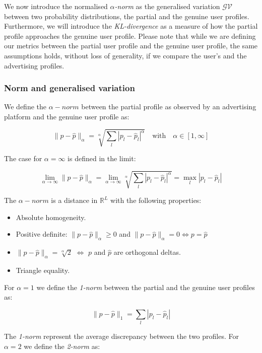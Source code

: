 We now introduce the normalised \emph{$\alpha$-norm} as the generalised variation $\mathcal{GV}$ between two probability distributions, the partial and the genuine user profiles. Furthermore, we will introduce the \emph{KL-divergence} as a measure of how the partial profile approaches the genuine user profile. Please note that while we are defining our metrics between the partial user profile and the genuine user profile, the same assumptions holds, without loss of generality, if we compare the user's and the advertising profiles.

\subsubsection{Norm and generalised variation}

We define the $\alpha-norm$ between the partial profile as observed by an advertising platform and the genuine user profile as:

$$ \| p - \hat{p} \|_\alpha = \sqrt[\alpha]{\sum_l{ {| p_l - \hat{p}_l |}^\alpha }} \quad  \text{with} \quad  \alpha \in [1, \infty] $$

The case for $\alpha = \infty$ is defined in the limit:

$$\lim_{\alpha\to\infty} \| p - \hat{p} \|_\alpha = \lim_{\alpha\to\infty} \sqrt[\alpha]{\sum_l{ {| p_l - \hat{p}_l |}^\alpha }} = \max_l { | p_l - \hat{p}_l | } $$

The $\alpha-norm$ is a distance in $\mathbb{R}^L$ with the following properties:

\begin{itemize}
 \item Absolute homogeneity.
 \item Positive definite: $ \| p - \hat{p} \|_\alpha \ge 0$ and $  \| p - \hat{p} \|_\alpha = 0 \Leftrightarrow p = \hat{p} $ 
 \item $ \| p - \hat{p} \|_\alpha = \sqrt[\alpha]{2}$ $\Leftrightarrow$  $p$ and $\hat{p}$ are orthogonal deltas.
 \item Triangle equality.
\end{itemize}

For $\alpha = 1$ we define the \emph{1-norm} between the partial and the genuine user profiles as:

$$ \| p - \hat{p} \|_1 = \sum_l{ | p_{l} - \hat{p}_{l} | }  $$

The \emph{1-norm} represent the average discrepancy between the two profiles. For $\alpha = 2$ we define the \emph{2-norm} as:

